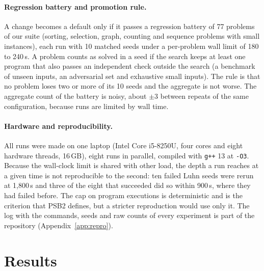 \documentclass[sigconf,nonacm]{acmart}
\begin{document}
\paragraph{Regression battery and promotion rule.}
A change becomes a default only if it passes a regression battery of 77 problems of our suite (sorting, selection, graph, counting and sequence
problems with small instances), each run with 10 matched seeds under a per-problem wall limit of 180 to 240\,s. A problem counts as solved in a
seed if the search keeps at least one program that also passes an independent check outside the search (a benchmark of unseen inputs,
an adversarial set and exhaustive small inputs). The rule is that no problem loses two or more of its 10 seeds and the aggregate is not
worse. The aggregate count of the battery is noisy, about $\pm 3$ between repeats of the same configuration, because runs are limited by wall time.

\paragraph{Hardware and reproducibility.}
All runs were made on one laptop (Intel Core i5-8250U, four cores and eight hardware threads, 16\,GB), eight runs in parallel, compiled
with \texttt{g++} 13 at \texttt{-O3}. Because the wall-clock limit is shared with other load, the depth a run reaches at a given time is not
reproducible to the second: ten failed Luhn seeds were rerun at 1,800\,s and three of the eight that succeeded did so within 900\,s, where
they had failed before. The cap on program executions is deterministic and is the criterion that PSB2 defines, but a stricter reproduction would use only it.
The log with the commands, seeds and raw counts of every experiment is part of the repository (Appendix~\ref{app:repro}).

\section{Results}
\label{sec:results}
\end{document}
